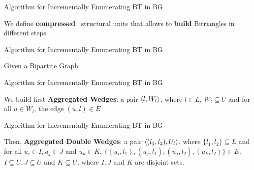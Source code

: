 \begin{frame}[fragile]{Algorithm for Incrementally Enumerating BT in BG}
  \begin{center}
    \large We define \textbf{compressed}~\cite{Lai} structural units that allows to \textbf{build} Bitriangles in different steps
  \end{center}    
\end{frame}

\begin{frame}[fragile]{Algorithm for Incrementally Enumerating BT in BG}
  \begin{center}
    Given a Bipartite Graph
  \end{center}    
  \begin{figure}
    \centering
  \end{figure}
\end{frame}

\begin{frame}[fragile]{Algorithm for Incrementally Enumerating BT in BG}
  \begin{center}
    We build first \textbf{Aggregated Wedges}: a pair $\left\langle l, W_l \right\rangle$, where $l \in L$, $W_l \subseteq U$ and for all $u \in W_l$, the edge  $(u,l)\in E$
  \end{center}    
  \begin{figure}
    \centering
  \end{figure}
\end{frame}

\begin{frame}[fragile]{Algorithm for Incrementally Enumerating BT in BG}
  \begin{center}
    Then, \textbf{Aggregated Double Wedges}: a pair  $\left\langle (l_1, l_2), U_l \right\rangle$, where $\{l_1,l_2\}\subseteq L$ and  for all $u_i \in I, u_j \in J$ and $u_k \in K$, $\{(u_i, l_1), (u_j, l_1), (u_j, l_2), (u_k, l_2)\} \in E$.
    $I \subseteq U, J \subseteq U$ and $K \subseteq U$, where $I, J$ and $K$ are disjoint sets. 
  \end{center}    
  \begin{figure}
    \centering
  \end{figure}
\end{frame}

